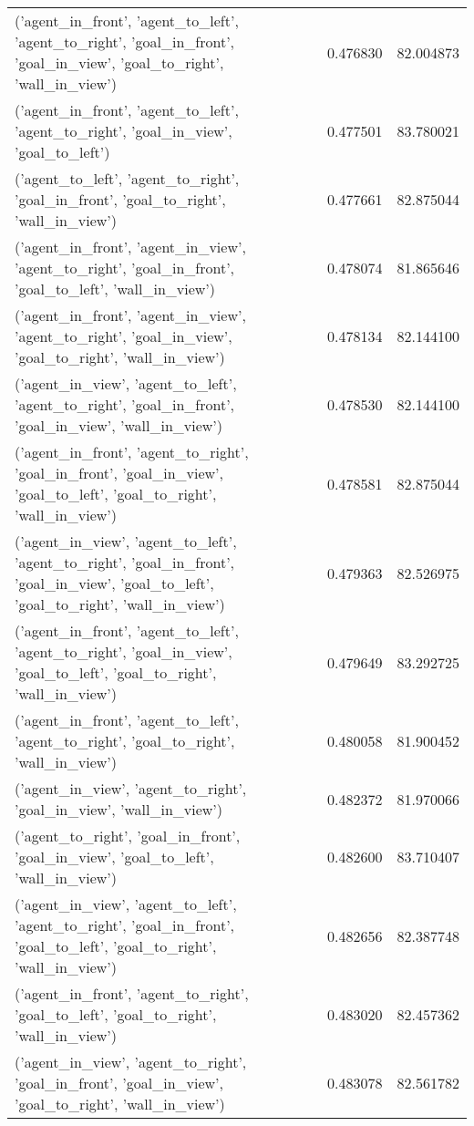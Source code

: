 \begin{tabular}{lrr}
('agent\_in\_front', 'agent\_to\_left', 'agent\_to\_right', 'goal\_in\_front', 'goal\_in\_view', 'goal\_to\_right', 'wall\_in\_view') & 0.476830 & 82.004873 \\
('agent\_in\_front', 'agent\_to\_left', 'agent\_to\_right', 'goal\_in\_view', 'goal\_to\_left') & 0.477501 & 83.780021 \\
('agent\_to\_left', 'agent\_to\_right', 'goal\_in\_front', 'goal\_to\_right', 'wall\_in\_view') & 0.477661 & 82.875044 \\
('agent\_in\_front', 'agent\_in\_view', 'agent\_to\_right', 'goal\_in\_front', 'goal\_to\_left', 'wall\_in\_view') & 0.478074 & 81.865646 \\
('agent\_in\_front', 'agent\_in\_view', 'agent\_to\_right', 'goal\_in\_view', 'goal\_to\_right', 'wall\_in\_view') & 0.478134 & 82.144100 \\
('agent\_in\_view', 'agent\_to\_left', 'agent\_to\_right', 'goal\_in\_front', 'goal\_in\_view', 'wall\_in\_view') & 0.478530 & 82.144100 \\
('agent\_in\_front', 'agent\_to\_right', 'goal\_in\_front', 'goal\_in\_view', 'goal\_to\_left', 'goal\_to\_right', 'wall\_in\_view') & 0.478581 & 82.875044 \\
('agent\_in\_view', 'agent\_to\_left', 'agent\_to\_right', 'goal\_in\_front', 'goal\_in\_view', 'goal\_to\_left', 'goal\_to\_right', 'wall\_in\_view') & 0.479363 & 82.526975 \\
('agent\_in\_front', 'agent\_to\_left', 'agent\_to\_right', 'goal\_in\_view', 'goal\_to\_left', 'goal\_to\_right', 'wall\_in\_view') & 0.479649 & 83.292725 \\
('agent\_in\_front', 'agent\_to\_left', 'agent\_to\_right', 'goal\_to\_right', 'wall\_in\_view') & 0.480058 & 81.900452 \\
('agent\_in\_view', 'agent\_to\_right', 'goal\_in\_view', 'wall\_in\_view') & 0.482372 & 81.970066 \\
('agent\_to\_right', 'goal\_in\_front', 'goal\_in\_view', 'goal\_to\_left', 'wall\_in\_view') & 0.482600 & 83.710407 \\
('agent\_in\_view', 'agent\_to\_left', 'agent\_to\_right', 'goal\_in\_front', 'goal\_to\_left', 'goal\_to\_right', 'wall\_in\_view') & 0.482656 & 82.387748 \\
('agent\_in\_front', 'agent\_to\_right', 'goal\_to\_left', 'goal\_to\_right', 'wall\_in\_view') & 0.483020 & 82.457362 \\
('agent\_in\_view', 'agent\_to\_right', 'goal\_in\_front', 'goal\_in\_view', 'goal\_to\_right', 'wall\_in\_view') & 0.483078 & 82.561782 \\

\end{tabular}
